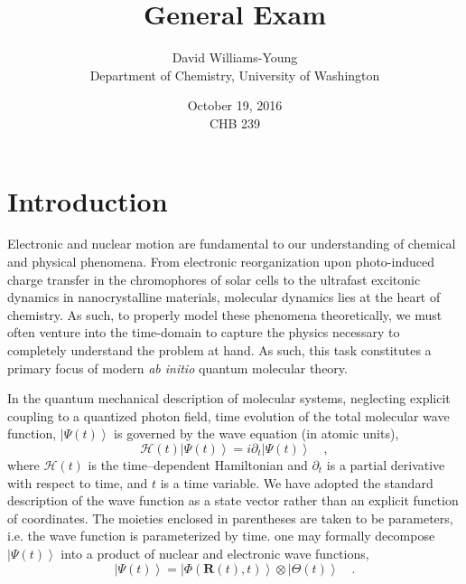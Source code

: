 \documentclass[12pt]{article}
\title{General Exam}
\date{October 19, 2016 \\ CHB 239}
\author{David Williams-Young\\ Department of Chemistry, University of Washington}
\newcommand{\ket}[1]{\left\vert #1 \right\rangle}         %
\newcommand*\vc[1]{\boldsymbol{#1}}
\begin{document}
\maketitle


\newpage
\section{Introduction}

Electronic and nuclear motion are fundamental to our understanding of chemical
and physical phenomena. From electronic reorganization upon photo-induced charge
transfer in the chromophores of solar cells to the ultrafast excitonic dynamics
in nanocrystalline materials, molecular dynamics lies at the heart of chemistry.
As such, to properly model these phenomena theoretically, we must often venture
into the time-domain to capture the physics necessary to completely understand
the problem at hand. As such, this task constitutes a primary focus of modern
\emph{ab initio} quantum molecular theory.

In the quantum mechanical description of molecular systems, neglecting explicit
coupling to a quantized photon field, time evolution of the total molecular wave
function, $\ket{\Psi (t)}$ is governed by the wave equation (in atomic units),
\begin{equation}
\mathscr{H}(t) \ket{\Psi (t)} = i\partial_t \ket{\Psi(t)} \quad,
\label{eq:WaveEq}
\end{equation}
where $\mathscr{H}(t)$ is the time--dependent Hamiltonian and $\partial_t$ is a
partial derivative with respect to time, and $t$ is a time variable. We have
adopted the standard description of the wave function as a state vector rather
than an explicit function of coordinates. The moieties enclosed in parentheses
are taken to be parameters, i.e. the wave function is parameterized by time.
one may formally decompose $\ket{\Psi (t)}$ into a product of nuclear and
electronic wave functions,
\begin{equation} 
\ket{\Psi (t)} = \ket{\Phi(\vc{R}(t),t)}\otimes\ket{\Theta(t)} 
\quad .  
\label{eq:exactSepElecNuc}
\end{equation} 
\end{document}
